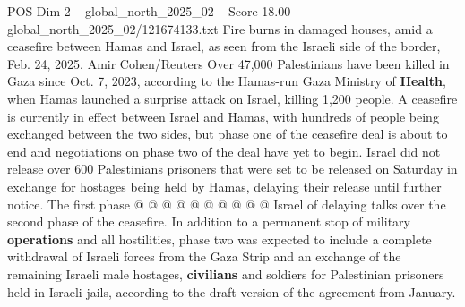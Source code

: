 \begin{textsample}{POS Dim 2 – global\_north\_2025\_02 – Score 18.00 – global\_north\_2025\_02/121674133.txt}
Fire burns in damaged houses, amid a ceasefire between Hamas and Israel, as seen from the Israeli side of the border, Feb. 24, 2025.
Amir Cohen/Reuters Over 47,000 Palestinians have been killed in Gaza since Oct. 7, 2023, according to the Hamas-run Gaza Ministry of \textbf{Health}, when Hamas launched a surprise attack on Israel, killing 1,200 people.
A ceasefire is currently in effect between Israel and Hamas, with hundreds of people being exchanged between the two sides, but phase one of the ceasefire deal is about to end and negotiations on phase two of the deal have yet to begin.
Israel did not release over 600 Palestinians prisoners that were set to be released on Saturday in exchange for hostages being held by Hamas, delaying their release until further notice.
The first phase @ @ @ @ @ @ @ @ @ @ Israel of delaying talks over the second phase of the ceasefire.
In addition to a permanent stop of military \textbf{operations} and all hostilities, phase two was expected to include a complete withdrawal of Israeli forces from the Gaza Strip and an exchange of the remaining Israeli male hostages, \textbf{civilians} and soldiers for Palestinian prisoners held in Israeli jails, according to the draft version of the agreement from January.

\end{textsample}
